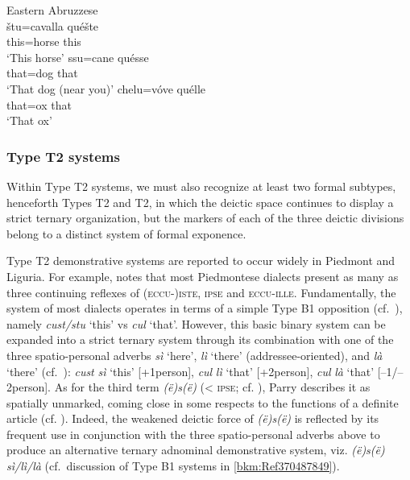 \documentclass[output=paper]{langsci/langscibook}
\begin{document}
\ea Eastern Abruzzese \citep{Verratti:1968a}\\
    \ea
    \gll štu=cavalla  quéšte\\
             this=horse  this\\
    \glt \enquote*{This horse}
    \ex
    \gll ssu=cane  quésse\\
             that=dog  that\\
    \glt  \enquote*{That dog (near you)}
    \ex
    \gll  chelu=vóve  quélle\\
            that=ox  that\\
    \glt \enquote*{That ox}
    \z
\z

\subsubsection{\label{bkm:Ref370495541}Type T2 systems}

Within Type T2 systems, we must also recognize at least two formal subtypes,
henceforth Types T2 and T2, in which the deictic space continues
to display a strict ternary organization, but the markers of each of the three
deictic divisions belong to a distinct system of formal exponence.

Type T2 demonstrative systems are reported to occur widely in Piedmont
and Liguria. For example, \citet[241]{Parry:1997a} notes that most Piedmontese
dialects present as many as three  continuing reflexes of
\textsc{(eccu-)iste,} \textsc{ipse} and \textsc{eccu-ille}. Fundamentally, the
system of most dialects operates in terms of a simple Type B1 opposition
(cf.\ ), namely \emph{cust/stu} ‘this’ vs \emph{cul}
‘that’. However, this basic binary system can be expanded into a strict ternary
system through its combination with one of the three spatio-personal adverbs
\emph{sì} ‘here’, \emph{lì} ‘there’ (addressee-oriented), and \emph{là} ‘there’
(cf.\ \citealt[219]{Lombardi-Vallauri:1995a}): \emph{cust} \emph{sì} ‘this’
[+1person], \emph{cul} \emph{lì} ‘that’ [+2person], \emph{cul} \emph{là} ‘that’
[–1/–2person]. As for the third term \emph{(ë)s(ë)} (< \textsc{ipse}; cf.
\citealt{Ascoli:1901a}), Parry describes it as spatially unmarked, coming close
in some respects to the functions of a definite article (cf.
\citealt[214]{Lombardi-Vallauri:1995a}). Indeed, the weakened deictic force of
\emph{(ë)s(ë)} is reflected by its frequent use in conjunction with the three
spatio-personal adverbs above to produce an alternative ternary adnominal
demonstrative system, viz. \emph{(ë)s(ë)} \emph{sì/lì/là} (cf.\ discussion of
Type B1 systems in \cref{bkm:Ref370487849}).
\end{document}
